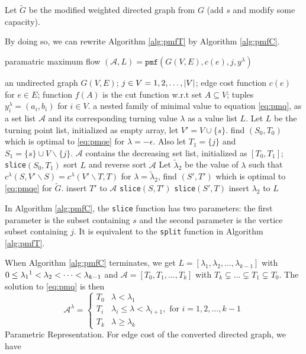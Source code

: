 \documentclass{article}
\begin{document}
Let $\widetilde{G}$ be the modified weighted directed graph from $G$ (add $s$ and modify some capacity). 


By doing so, we can rewrite Algorithm \ref{alg:pmfT} by Algorithm \ref{alg:pmfC}.
\begin{algorithm}
\caption{paramatric maximum flow $(\mathcal{A}, L) = \texttt{pmf}(G(V,E), c(e), j, y^{\lambda})$}\label{alg:pmfC}
\begin{algorithmic}[1]
\REQUIRE an undirected graph $G(V, E)$; $j \in V={1,2,\dots, \lvert V\rvert}$; edge cost function $c(e)$ for $e \in E$; function $f(A)$ is the cut function w.r.t set $A\subseteq V$; tuples $y^{\lambda}_i = (a_i, b_i)$ for $i \in V$.
\ENSURE a nested family of minimal value to equation \eqref{eq:pmq}, as a set list $\mathcal{A}$ and its corresponding turning value $\lambda$ as a value list $L$.
\STATE Let $L$ be the turning point list, initialized as empty array, let $V'=V\cup\{s\}$.
\STATE find $(S_0, T_0)$ which is optimal to \eqref{eq:pmqe} for $ \lambda  = -\epsilon$.  Also let $T_1 = \{j\}$ and $S_1 = \{s\}\cup V \backslash \{j\}$.
\STATE $\mathcal{A}$ contains the decreasing set list, initialized as $[T_0, T_1]$;
\STATE \texttt{slice}$( S_0, T_1)$
\STATE sort $L$ and reverse sort $\mathcal{A}$
  \STATE Let $\tilde{\lambda}_2$ be the value of $\lambda$ such that $c^{\lambda}(S, V'\backslash S) = 
c^{\lambda}(V'\backslash T, T)$ \label{findLambda}
\STATE for $\lambda = \tilde{\lambda}_2$, find $(S', T')$ which is optimal to \eqref{eq:pmqe} for $\widetilde{G}$.
\STATE insert $T'$ to $\mathcal{A}$
\STATE \texttt{slice}$(S, T')$
\STATE \texttt{slice}$(S', T)$
\ELSE
\STATE insert $\lambda_2$ to $L$
\ENDIF
\ENDFUNCTION
\end{algorithmic}
\end{algorithm}
In Algorithm \ref{alg:pmfC}, the \texttt{slice} function has two parameters:
the first parameter is the subset containing $s$ and the second parameter is the vertice subset containing $j$. It is equivalent to the \texttt{split} function in Algorithm \ref{alg:pmfT}.

When Algorithm \ref{alg:pmfC} terminates, we get $L=[\lambda_1, \lambda_2, \dots, \lambda_{k-1}]$ with
$0 \leq \lambda_1 \footnotemark < \lambda_2 < \dots < \lambda_{k-1}$ and $\mathcal{A} = [T_0, T_1, \dots, T_k]$ with 
$T_k \subsetneq  \dots \subsetneq T_1 \subsetneq T_0$.  The solution to \eqref{eq:pmq} is then
\begin{equation}\label{eq:Alambda}
\mathcal{A}^{\lambda}=\begin{cases}
T_0 & \lambda < \lambda_1 \\
T_i & \lambda_i \leq \lambda < \lambda_{i+1}, \textrm{ for } i=1, 2, \dots, k-1 \\
T_k & \lambda \geq \lambda_{k}
\end{cases}
\end{equation}
Parametric Representation. For edge cost of the converted directed graph, we have
\end{document}
